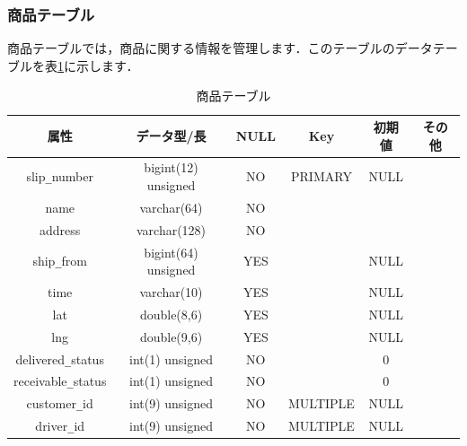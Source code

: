 \documentclass[a4j,titlepage]{jarticle}
\begin{document}
\subsubsection{商品テーブル}
商品テーブルでは，商品に関する情報を管理します．このテーブルのデータテーブルを表\ref{delivery}に示します．
\begin{table}[htb]
  \caption{商品テーブル}
  \label{delivery}
  \begin{center}
    \begin{tabular}{|c|c|c|c|c|c|} \hline
      属性 & データ型/長 & NULL & Key & 初期値 & その他 \\ \hline \hline
      slip\verb|_|number & bigint(12) unsigned & NO & PRIMARY & NULL & \\ \hline
      name & varchar(64) & NO &   &  & \\ \hline
      address & varchar(128) & NO &   &  & \\ \hline
      ship\verb|_|from & bigint(64) unsigned & YES &  & NULL & \\ \hline
      time & varchar(10) & YES &   & NULL & \\ \hline
      lat & double(8,6) & YES &   & NULL & \\ \hline
      lng & double(9,6) & YES &   & NULL & \\ \hline
      delivered\verb|_|status & int(1) unsigned & NO &   & 0 & \\ \hline
      receivable\verb|_|status & int(1) unsigned & NO &  & 0 & \\ \hline
      customer\verb|_|id & int(9) unsigned & NO & MULTIPLE & NULL & \\ \hline
      driver\verb|_|id & int(9) unsigned & NO & MULTIPLE & NULL & \\ \hline
    \end{tabular}
  \end{center}
\end{table}
\end{document}
